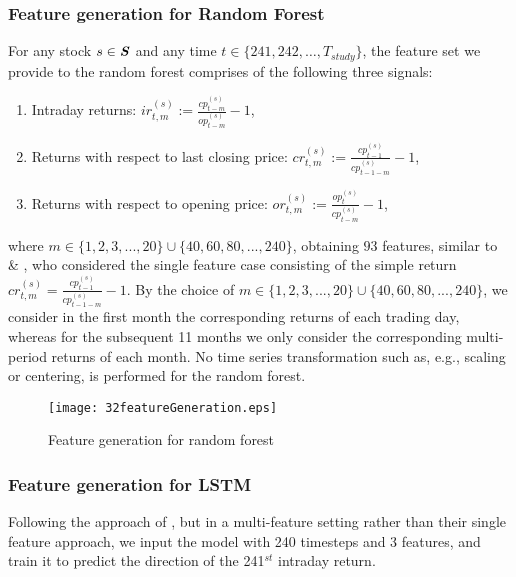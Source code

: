 \documentclass[review]{elsarticle}
\begin{document}
\subsubsection{Feature  generation for Random Forest}\label{subsubsec:feature-RF}
For any stock $s \in \textbf{\textit{S}}$ and any time $t\in \{241,242,\dots,T_{study}\}$, the 
feature set we provide  to the random forest comprises of the following three signals:
\begin{enumerate}\item Intraday returns: $ir^{(s)}_{t,m} := \frac{cp^{(s)}_{t-m}}{op^{(s)}_{t-m}}-1$,
    \item Returns with respect to last closing price: $cr^{(s)}_{t,m} := \frac{cp^{(s)}_{t-1}}{cp^{(s)}_{t-1-m}}-1$,
    \item Returns with respect to opening price: $or^{(s)}_{t,m} := \frac{op^{(s)}_{t}}{cp^{(s)}_{t-m}}-1$,
\end{enumerate}
where $m \in \{1,2,3,...,20\} \cup \{40,60,80,...,240\}$, obtaining $93$ features, similar to \cite{takeuchi2013} \& \cite{krauss17}, who  considered the single feature case consisting of the simple return
$cr^{(s)}_{t,m} = \frac{cp^{(s)}_{t-1}}{cp^{(s)}_{t-1-m}}-1$. 
By the choice of $m\in\{1,2,3,...,20\}\cup \{40,60,80,...,240\}$,
we consider in the first month the corresponding returns of each trading day, whereas for the subsequent 11 months we only consider the corresponding multi-period returns of each month.
No time series transformation such as, e.g., scaling or centering, is performed for the random forest.
\begin{figure}[h!]
	\centering
	
	\texttt{[image: 32featureGeneration.eps]} \hfill
	\caption{Feature  generation for random forest}
	\label{fig:figure3.2.1.featureGenRandomForest}
\end{figure}
\subsubsection{Feature  generation for LSTM} Following the approach of \cite{krauss18}, but in a multi-feature setting rather than their single feature approach, we  
input the model with 240 timesteps and 3 features, and train it to predict the direction of the 241$^{st}$ intraday return. 
\end{document}
